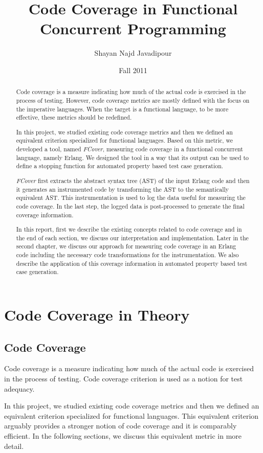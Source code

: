 \documentclass[12pt,a4paper]{report}
\title{Code Coverage in Functional Concurrent Programming}
\author{Shayan Najd Javadipour}
\date{Fall 2011}
\begin{document}
\maketitle
\begin{abstract}
Code coverage is a measure indicating how much of the actual code is exercised in the process of testing. However, code coverage metrics are mostly defined with the focus on the imperative languages. When the target is a functional language, to be more effective, these metrics should be redefined.

In this project, we studied existing code coverage metrics and then we defined an equivalent criterion specialized for functional languages. Based on this metric, we developed a tool, named \emph{FCover}, measuring code coverage in a functional concurrent language, namely Erlang. We designed the tool in a way that its output can be used to define a stopping function for automated property based test case generation.

\emph{FCover} first extracts the abstract syntax tree (AST) of the input Erlang code and then it generates an instrumented code by transforming the AST to the semantically equivalent AST. This instrumentation is used to log the data useful for measuring the code coverage. In the last step, the logged data is post-processed to generate the final coverage information.  

In this report, first we describe the existing concepts related to code coverage and in the end of each section, we discuss our interpretation and implementation. Later in the second chapter, we discuss our approach for measuring code coverage in an Erlang code including the necessary code transformations for the instrumentation. We also describe the application of this coverage information in automated property based test case generation.
\end{abstract}
\tableofcontents
\chapter{Code Coverage in Theory}
\newpage
\section{Code Coverage}
Code coverage is a measure indicating how much of the actual code is exercised in the process of testing. Code coverage criterion is used as a notion for test adequacy.\cite{Zhu:1997:SUT:267580.267590}

In this project, we studied existing code coverage metrics and then we defined an equivalent criterion specialized for functional languages. This equivalent criterion arguably provides a stronger notion of code coverage and it is comparably efficient. In the following sections, we discuss this equivalent metric in more detail.
\end{document}

